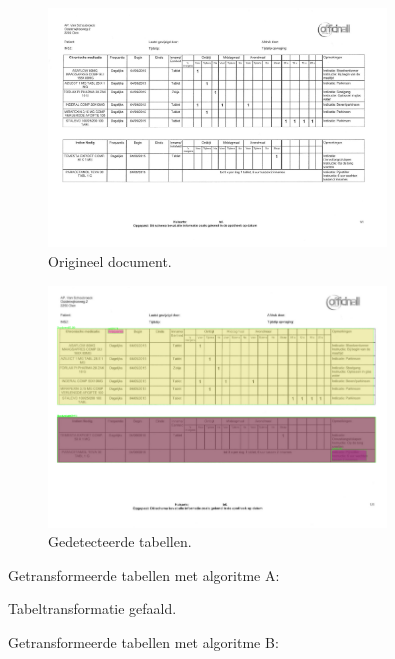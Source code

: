 \begin{figure}[H]
    \centering
    \includegraphics[width=0.8\textwidth]{test-resultaten/20/original.png}
    \caption{Origineel document.}
\end{figure}

\begin{figure}[H]
    \centering
    \includegraphics[width=0.8\textwidth]{test-resultaten/20/detected_tables.png}
    \caption{Gedetecteerde tabellen.}
\end{figure}

Getransformeerde tabellen met algoritme A:

Tabeltransformatie gefaald.

Getransformeerde tabellen met algoritme B:

